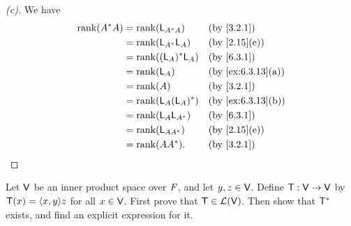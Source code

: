 \begin{proof}[(c)]
  We have
  \begin{align*}
    \rk{A^* A} & = \rk{\L_{A^* A}}    &  & \by{3.2.1}        \\
               & = \rk{\L_{A^*} \L_A} &  & \by{2.15}[e]      \\
               & = \rk{(\L_A)^* \L_A} &  & \by{6.3.1}        \\
               & = \rk{\L_A}          &  & \by{ex:6.3.13}[a] \\
               & = \rk{A}             &  & \by{3.2.1}        \\
               & = \rk{\L_A (\L_A)^*} &  & \by{ex:6.3.13}[b] \\
               & = \rk{\L_A \L_{A^*}} &  & \by{6.3.1}        \\
               & = \rk{\L_{A A^*}}    &  & \by{2.15}[e]      \\
               & = \rk{A A^*}.        &  & \by{3.2.1}
  \end{align*}
\end{proof}

\begin{ex}\label{ex:6.3.14}
  Let \(\mathsf{V}\) be an inner product space over \(\mathit{F}\), and let \(y, z \in \mathsf{V}\).
  Define \(\mathsf{T} : \mathsf{V} \to \mathsf{V}\) by \(\T(x) = \inn{x, y} z\) for all \(x \in \mathsf{V}\).
  First prove that \(\mathsf{T} \in \mathcal{L}(\mathsf{V})\).
  Then show that \(\mathsf{T}^*\) exists, and find an explicit expression for it.
\end{ex}

